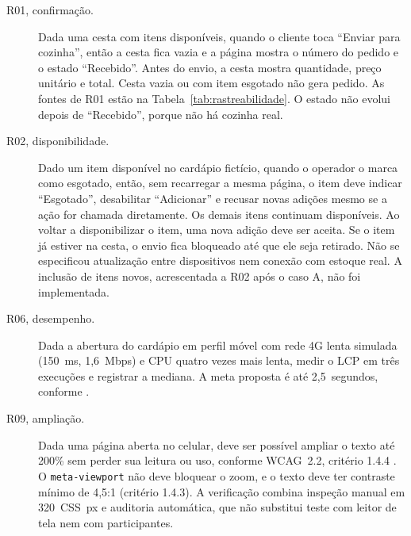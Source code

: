 \begin{description}
    \item[R01, confirmação.] Dada uma cesta com itens disponíveis, quando o cliente toca ``Enviar para cozinha'', então a cesta fica vazia e a página mostra o número do pedido e o estado ``Recebido''. Antes do envio, a cesta mostra quantidade, preço unitário e total. Cesta vazia ou com item esgotado não gera pedido. As fontes de R01 estão na Tabela~\ref{tab:rastreabilidade}. O estado não evolui depois de ``Recebido'', porque não há cozinha real.
    \item[R02, disponibilidade.] Dado um item disponível no cardápio fictício, quando o operador o marca como esgotado, então, sem recarregar a mesma página, o item deve indicar ``Esgotado'', desabilitar ``Adicionar'' e recusar novas adições mesmo se a ação for chamada diretamente. Os demais itens continuam disponíveis. Ao voltar a disponibilizar o item, uma nova adição deve ser aceita. Se o item já estiver na cesta, o envio fica bloqueado até que ele seja retirado. Não se especificou atualização entre dispositivos nem conexão com estoque real. A inclusão de itens novos, acrescentada a R02 após o caso A, não foi implementada.
    \item[R06, desempenho.] Dada a abertura do cardápio em perfil móvel com rede 4G lenta simulada (150~ms, 1,6~Mbps) e CPU quatro vezes mais lenta, medir o LCP em três execuções e registrar a mediana. A meta proposta é até 2,5~segundos, conforme .
    \item[R09, ampliação.] Dada uma página aberta no celular, deve ser possível ampliar o texto até 200\% sem perder sua leitura ou uso, conforme WCAG~2.2, critério 1.4.4 \cite{wcag22}. O \texttt{meta-viewport} não deve bloquear o zoom, e o texto deve ter contraste mínimo de 4,5:1 (critério 1.4.3). A verificação combina inspeção manual em 320~CSS~px e auditoria automática, que não substitui teste com leitor de tela nem com participantes.
\end{description}

